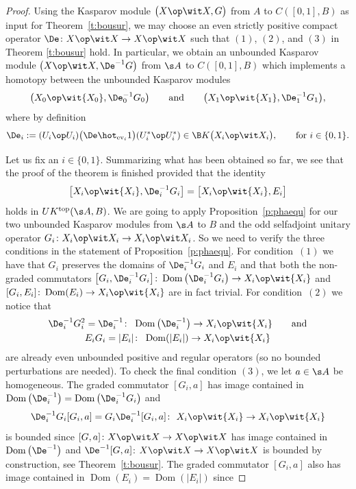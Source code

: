 \begin{proof}
Using the Kasparov module $\big(X \op \wit X, G\big)$ from $A$ to $C([0,1],B)$ as input for Theorem~\ref{t:bousur}, we may choose an even strictly positive compact operator $\De\colon X \op \wit X \to X \op \wit X$ such that $(1)$, $(2)$, and $(3)$ in Theorem \ref{t:bousur} hold. In particular, we obtain an unbounded Kasparov module $\big( X \op \wit X, \De^{-1}G\big)$ from $\s A$ to $C([0,1],B)$ which implements a homotopy between the unbounded Kasparov modules
\[
\big(X_0 \op \wit{X_0}, \De_0^{-1} G_0\big) \qquad \text{and} \qquad \big(X_1 \op \wit{X_1}, \De_1^{-1} G_1\big) ,
\]
where by definition
\[
\De_i := (U_i \op U_i) \big(\De \hot_{{\rm ev}_i} 1 \big) (U_i^* \op U_i^*) \in \B K\big( X_i \op \wit X_i\big) , \qquad \text{for } i \in \{0,1\} .
\]

Let us fix an $i \in \{0,1\}$. Summarizing what has been obtained so far, we see that the proof of the theorem is finished provided that the identity
\[
\big[X_i \op \wit{X_i}, \De_i^{-1} G_i\big] = \big[ X_i \op \wit{X_i}, E_i\big]
\]
holds in $UK^{{\rm top}}(\s A,B)$. We are going to apply Proposition~\ref{p:phaequ} for our two unbounded Kasparov modules from $\s A$ to $B$ and the odd selfadjoint unitary operator $G_i\colon X_i \op \wit X_i \to X_i \op \wit X_i$. So we need to verify the three conditions in the statement of Proposition~\ref{p:phaequ}. For condition~$(1)$ we have that $G_i$ preserves the domains of $\De_i^{-1} G_i$ and $E_i$ and that both the non-graded commutators $\big[G_i, \De_i^{-1} G_i\big]\colon \operatorname{Dom}\big(\De_i^{-1} G_i\big) \to X_i \op \wit{X_i}$ and $[G_i, E_i]\colon \operatorname{Dom}(E_i) \to X_i \op \wit{X_i}$ are in fact trivial. For condition~$(2)$ we notice that
\begin{gather*}
 \De_i^{-1} G_i^2 = \De_i^{-1}\colon \ \operatorname{Dom}\big(\De_i^{-1}\big) \to X_i \op \wit{X_i} \qquad \text{and} \\
 E_i G_i = |E_i|\colon \ \operatorname{Dom}(|E_i|) \to X_i \op \wit{X_i}
\end{gather*}
are already even unbounded positive and regular operators (so no bounded perturbations are needed). To check the final condition $(3)$, we let $a \in \s A$ be homogeneous. The graded commutator $[G_i,a]$ has image contained in $\operatorname{Dom}\big(\De_i^{-1}\big) = \operatorname{Dom}\big(\De_i^{-1} G_i\big)$ and
\[
\De_i^{-1} G_i [G_i,a] = G_i \De_i^{-1} [G_i,a]\colon\ X_i \op \wit{X_i} \to X_i \op \wit{X_i}
\]
is bounded since $[G,a]\colon X \op \wit X \to X \op \wit X$ has image contained in $\operatorname{Dom}\big(\De^{-1}\big)$ and $\De^{-1} [G,a]$: $X \op \wit X \to X \op \wit X$ is bounded by construction, see Theorem~\ref{t:bousur}. The graded commutator $[G_i,a]$ also has image contained in $\operatorname{Dom}(E_i) = \operatorname{Dom}(|E_i|)$ since

\end{proof}
